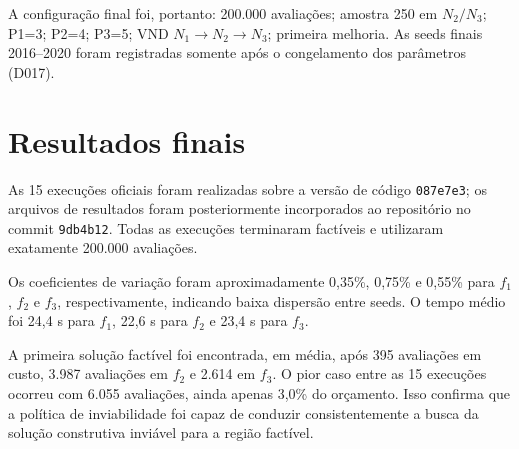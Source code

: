 \documentclass[10pt,twocolumn,a4paper]{article}
\begin{document}
A configuração final foi, portanto: 200.000 avaliações; amostra 250 em $N_2/N_3$; P1=3; P2=4; P3=5; VND $N_1 \to N_2 \to N_3$; primeira melhoria. As seeds finais 2016--2020 foram registradas somente após o congelamento dos parâmetros (D017).

\section{Resultados finais}

As 15 execuções oficiais foram realizadas sobre a versão de código \texttt{087e7e3}; os arquivos de resultados foram posteriormente incorporados ao repositório no commit \texttt{9db4b12}. Todas as execuções terminaram factíveis e utilizaram exatamente 200.000 avaliações.

\begin{table}[t]
\centering
\caption{Resultados finais das cinco execuções por objetivo (sementes 2016--2020) e estatísticas agregadas.}
\label{tab:resultados_finais}
\end{table}

Os coeficientes de variação foram aproximadamente 0,35\%, 0,75\% e 0,55\% para $f_1$, $f_2$ e $f_3$, respectivamente, indicando baixa dispersão entre seeds. O tempo médio foi 24,4 s para $f_1$, 22,6 s para $f_2$ e 23,4 s para $f_3$.

A primeira solução factível foi encontrada, em média, após 395 avaliações em custo, 3.987 avaliações em $f_2$ e 2.614 em $f_3$. O pior caso entre as 15 execuções ocorreu com 6.055 avaliações, ainda apenas 3,0\% do orçamento. Isso confirma que a política de inviabilidade foi capaz de conduzir consistentemente a busca da solução construtiva inviável para a região factível.
\end{document}
